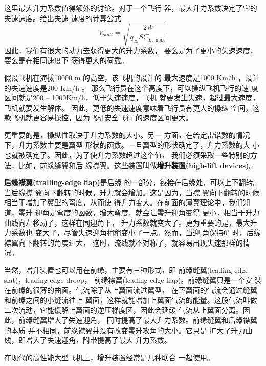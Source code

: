 这里最大升力系数值得额外的讨论。对于一个飞行
器，最大升力系数决定了它的失速速度。给出失速
速度的计算公式
\[
  V_{stall}=\sqrt{\frac{2W}{q_\infty S C_{L,\max}}} 
\]
因此，我们有很大的动力去获得更大的升力系数，
要么是为了更小的失速速度，要么是在相同速度下
获得更大的荷载。
 \begin{notice}
 假设飞机在海拔10000 m 的高空，该飞机的设计的
 最大速度是1000 Km/h ，设计的失速速度是200 Km/h 。
 那么飞行员在这个高度下，可以操纵飞机飞行的速
 度区间就是200 -- 1000Km/h，低于失速速度，飞机
 就要发生失速，超过最大速度，飞机就要发生解体。
 因此，更低的失速速度意味着飞行员有更大的操纵
 空间，这款飞机就更容易操控，因为飞机安全飞行
 的速度区间更大。
 \end{notice}
更重要的是，操纵性取决于升力系数的大小。另一
方面，在给定雷诺数的情况下，升力系数主要是翼型
形状的函数。一旦翼型的形状确定了，升力系数的大
小也就被确定了。因此，为了使升力系数超过这个值，
我们必须采取一些特别的方法，比如，前缘缝翼和后
缘襟翼。这些装置叫做{\bfseries 增升装置(high-lift devices)}。

{\bfseries 后缘襟翼(tralling-edge flap)}是后缘
的一部分，铰接在后缘处，可以上下翻转。当后缘襟
翼向下翻转的时候，升力就会增加。这是因为，当襟
翼向下翻转的时候相当于增加了翼型的弯度，从而使
得升力变大。在前面的薄翼理论中，我们知道，零升
迎角是弯度的函数，增大弯度，就会让零升迎角变得
更小，相当于升力曲线向左移动了，这样在同迎角下，
升力系数就变大了。更为重要的是，最大升力系数也
变大了，尽管失速迎角稍稍变小了一点。然而，当迎
角保持$0^\circ$ 时，后缘襟翼向下翻转的角度过大，
这时，流线就不对称了，就容易出现失速那样的情况。

当然，增升装置也可以用在前缘，主要有三种形式，即
前缘缝翼(leading-edge slat)，leading-edge droop，
前缘襟翼(leading-edge flap)。前缘缝翼只是一个安
装在前缘的很薄的曲面。气流除了从上翼面流过翼型，
在下翼面的气流会通过缝翼和前缘之间的小缝流往上
翼面，这样就能增加上翼面气流的能量。这股气流叫做
二次流动，它能缓解上翼面的逆压梯度区，因此会延缓
气流从上翼面分离。因此，前缘缝翼增大了失速迎角，
同时提高了最大升力系数。前缘缝翼和后缘襟翼的本质
并不相同，前缘襟翼并没有改变零升攻角的大小。它只是
扩大了升力曲线，即增大了失速迎角，附带提高了最大
升力系数。

在现代的高性能大型飞机上，增升装置经常是几种联合
一起使用。

